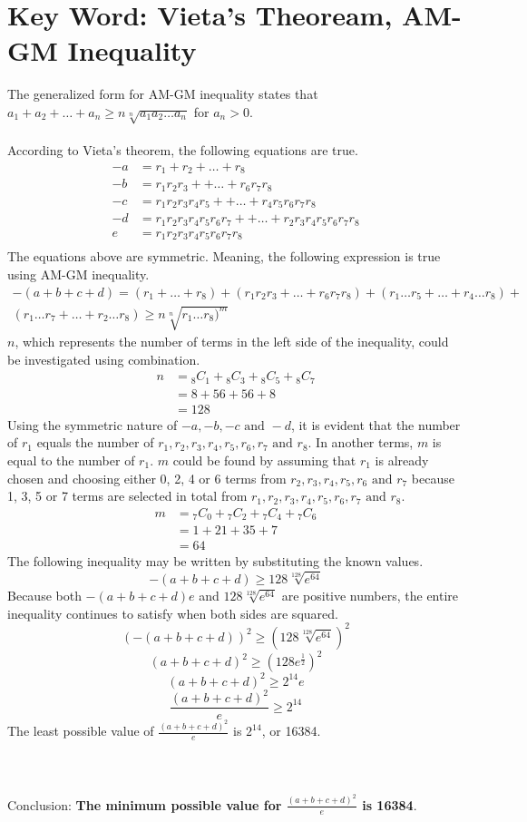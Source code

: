 \documentclass[12pt]{report}
\begin{document}
\section*{Key Word: Vieta's Theoream, AM-GM Inequality}
The generalized form for AM-GM inequality states that $a_1+a_2+\dots+a_n \ge n\sqrt[n]{a_1a_2\dots a_n}$ for $a_n>0$.
\\\\
According to Vieta's theorem, the following equations are true.
\begin{align*}
    -a &= r_1+r_2+\dots+r_8 \\
    -b &= r_1r_2r_3++\dots+r_6r_7r_8 \\
    -c &= r_1r_2r_3r_4r_5++\dots+r_4r_5r_6r_7r_8 \\
    -d &= r_1r_2r_3r_4r_5r_6r_7++\dots+r_2r_3r_4r_5r_6r_7r_8 \\
    e &= r_1r_2r_3r_4r_5r_6r_7r_8 \\
\end{align*}
The equations above are symmetric. Meaning, the following expression is true using AM-GM inequality.
\begin{multline*}
-(a+b+c+d)=(r_1+\dots+r_8)+(r_1r_2r_3+\dots+r_6r_7r_8)+(r_1\dots r_5+\dots+r_4\dots r_8)+\\(r_1\dots r_7+\dots+r_2\dots r_8) \ge n\sqrt[n]{r_1\dots r_8)^m}
\end{multline*}
$n$, which represents the number of terms in the left side of the inequality, could be investigated using combination.
\begin{align*}
    n &={_8}C_1+{_8}C_3+{_8}C_5+{_8}C_7 \\
    &=8+56+56+8 \\
    &= 128
\end{align*}
Using the symmetric nature of $-a,-b,-c\text{ and }-d$, it is evident that the number of $r_1$ equals the number of $r_1,r_2,r_3,r_4,r_5,r_6,r_7 \text{ and }r_8$. In another terms, $m$ is equal to the number of $r_1$. $m$ could be found by assuming that $r_1$ is already chosen and choosing either 0, 2, 4 or 6 terms from $r_2,r_3,r_4,r_5,r_6 \text{ and } r_7$ because 1, 3, 5 or 7 terms are selected in total from $r_1,r_2,r_3,r_4,r_5,r_6,r_7 \text{ and }r_8$.
\begin{align*}
    m &={_7}C_0+{_7}C_2+{_7}C_4+{_7}C_6 \\
    &=1+21+35+7 \\
    &= 64
\end{align*}
The following inequality may be written by substituting the known values.
\[
-(a+b+c+d)\ge 128\sqrt[128]{e^{64}}
\]
Because both $-(a+b+c+d)e$ and $128\sqrt[128]{e^{64}}$ are positive numbers, the entire inequality continues to satisfy when both sides are squared.
\[
\left(-(a+b+c+d)\right)^2\ge \left(128\sqrt[128]{e^{64}}\right)^2
\]
\[
(a+b+c+d)^2\ge \left(128e^{\frac{1}{2}}\right)^2
\]
\[
(a+b+c+d)^2\ge 2^{14}e
\]
\[
\frac{(a+b+c+d)^2}{e} \ge 2^{14}
\]
The least possible value of $\frac{(a+b+c+d)^2}{e}$ is $2^{14}$, or 16384.
\\\\
\\\\
Conclusion: \textbf{The minimum possible value for $\frac{(a+b+c+d)^2}{e}$ is 16384}.
\end{document}
